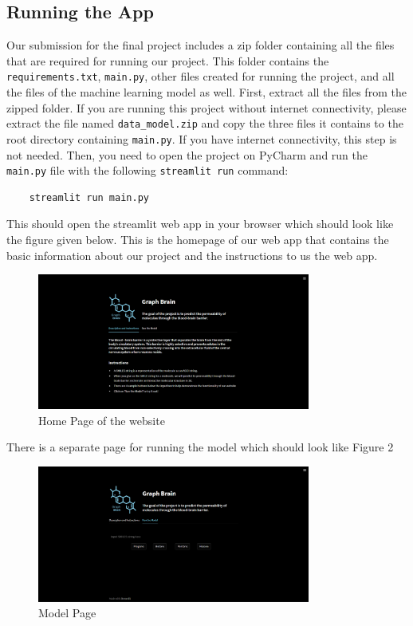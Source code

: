 \documentclass[fontsize=11pt]{article}
\begin{document}
\subsection*{Running the App}
Our submission for the final project includes a zip folder containing all the files that are required for running our project. This folder contains the \texttt{requirements.txt}, \texttt{main.py}, other files created for running the project, and all the files of the machine learning model as well. First, extract all the files from the zipped folder. If you are running this project without internet connectivity, please extract the file named \texttt{data\_model.zip} and copy the three files it contains to the root directory containing \texttt{main.py}. If you have internet connectivity, this step is not needed. Then, you need to open the project on PyCharm and run the \texttt{main.py} file with the following \texttt{streamlit run} command:

\begin{verbatim}
    streamlit run main.py
\end{verbatim}

This should open the streamlit web app in your browser which should look like the figure given below. This is the homepage of our web app that contains the basic information about our project and the instructions to us the web app.

\begin{figure}[ht]
    \centering
    \includegraphics[width=0.8\textwidth]{webapp1.png}
    \caption{Home Page of the website}
    \label{fig:homepage}
\end{figure}

There is a separate page for running the model which should look like Figure 2

\begin{figure}[ht]
    \centering
    \includegraphics[width=0.8\textwidth]{webapp2.png}
    \caption{Model Page}
    \label{fig:modelpage}
\end{figure}
\end{document}
